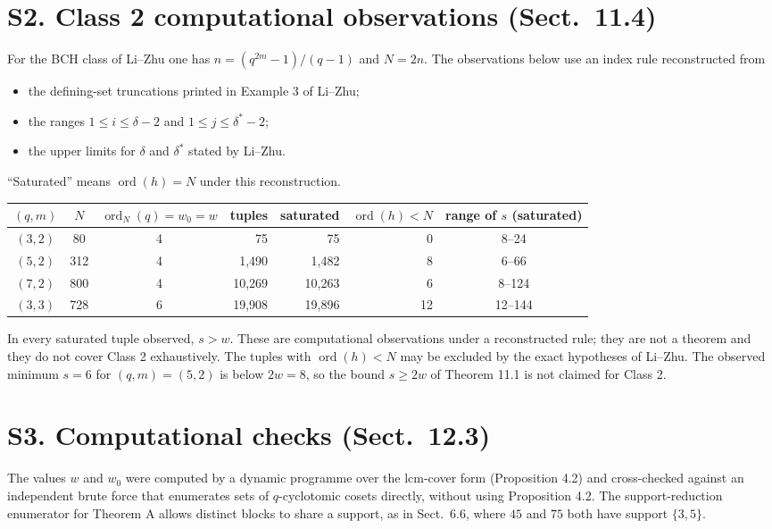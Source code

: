 \documentclass[11pt,a4paper]{article}
\begin{document}
\section*{S2. Class 2 computational observations (Sect.~11.4)}

For the BCH class of Li--Zhu one has $n=(q^{2m}-1)/(q-1)$ and $N=2n$. The observations below use an index rule reconstructed from
\begin{itemize}
\item the defining-set truncations printed in Example 3 of Li--Zhu;
\item the ranges $1\le i\le\delta-2$ and $1\le j\le\delta^{*}-2$;
\item the upper limits for $\delta$ and $\delta^{*}$ stated by Li--Zhu.
\end{itemize}
``Saturated'' means $\operatorname{ord}(h)=N$ under this reconstruction.

\begin{center}
\small
\begin{tabular}{@{}cccrrrc@{}}
\toprule
$(q,m)$ & $N$ & $\operatorname{ord}_N(q)=w_0=w$ & tuples & saturated & $\operatorname{ord}(h)<N$ & range of $s$ (saturated)\\
\midrule
$(3,2)$ & 80  & 4 & 75     & 75     & 0  & 8--24\\
$(5,2)$ & 312 & 4 & 1,490  & 1,482  & 8  & 6--66\\
$(7,2)$ & 800 & 4 & 10,269 & 10,263 & 6  & 8--124\\
$(3,3)$ & 728 & 6 & 19,908 & 19,896 & 12 & 12--144\\
\bottomrule
\end{tabular}
\end{center}

In every saturated tuple observed, $s>w$. These are computational observations under a reconstructed rule; they are not a theorem and they do not cover Class 2 exhaustively. The tuples with $\operatorname{ord}(h)<N$ may be excluded by the exact hypotheses of Li--Zhu. The observed minimum $s=6$ for $(q,m)=(5,2)$ is below $2w=8$, so the bound $s\ge 2w$ of Theorem 11.1 is not claimed for Class 2.

\section*{S3. Computational checks (Sect.~12.3)}

The values $w$ and $w_0$ were computed by a dynamic programme over the lcm-cover form (Proposition 4.2) and cross-checked against an independent brute force that enumerates sets of $q$-cyclotomic cosets directly, without using Proposition 4.2. The support-reduction enumerator for Theorem A allows distinct blocks to share a support, as in Sect.~6.6, where $45$ and $75$ both have support $\{3,5\}$.
\end{document}
